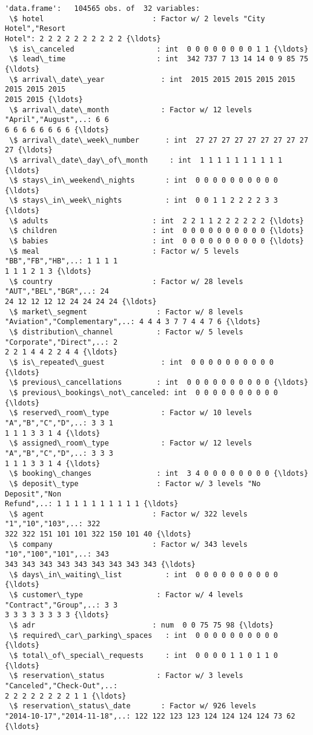 \documentclass[11pt]{article}
\begin{document}
    \begin{Verbatim}[commandchars=\\\{\}]
'data.frame':   104565 obs. of  32 variables:
 \$ hotel                         : Factor w/ 2 levels "City Hotel","Resort
Hotel": 2 2 2 2 2 2 2 2 2 2 {\ldots}
 \$ is\_canceled                   : int  0 0 0 0 0 0 0 0 1 1 {\ldots}
 \$ lead\_time                     : int  342 737 7 13 14 14 0 9 85 75 {\ldots}
 \$ arrival\_date\_year             : int  2015 2015 2015 2015 2015 2015 2015 2015
2015 2015 {\ldots}
 \$ arrival\_date\_month            : Factor w/ 12 levels "April","August",..: 6 6
6 6 6 6 6 6 6 6 {\ldots}
 \$ arrival\_date\_week\_number      : int  27 27 27 27 27 27 27 27 27 27 {\ldots}
 \$ arrival\_date\_day\_of\_month     : int  1 1 1 1 1 1 1 1 1 1 {\ldots}
 \$ stays\_in\_weekend\_nights       : int  0 0 0 0 0 0 0 0 0 0 {\ldots}
 \$ stays\_in\_week\_nights          : int  0 0 1 1 2 2 2 2 3 3 {\ldots}
 \$ adults                        : int  2 2 1 1 2 2 2 2 2 2 {\ldots}
 \$ children                      : int  0 0 0 0 0 0 0 0 0 0 {\ldots}
 \$ babies                        : int  0 0 0 0 0 0 0 0 0 0 {\ldots}
 \$ meal                          : Factor w/ 5 levels "BB","FB","HB",..: 1 1 1 1
1 1 1 2 1 3 {\ldots}
 \$ country                       : Factor w/ 28 levels "AUT","BEL","BGR",..: 24
24 12 12 12 12 24 24 24 24 {\ldots}
 \$ market\_segment                : Factor w/ 8 levels
"Aviation","Complementary",..: 4 4 4 3 7 7 4 4 7 6 {\ldots}
 \$ distribution\_channel          : Factor w/ 5 levels "Corporate","Direct",..: 2
2 2 1 4 4 2 2 4 4 {\ldots}
 \$ is\_repeated\_guest             : int  0 0 0 0 0 0 0 0 0 0 {\ldots}
 \$ previous\_cancellations        : int  0 0 0 0 0 0 0 0 0 0 {\ldots}
 \$ previous\_bookings\_not\_canceled: int  0 0 0 0 0 0 0 0 0 0 {\ldots}
 \$ reserved\_room\_type            : Factor w/ 10 levels "A","B","C","D",..: 3 3 1
1 1 1 3 3 1 4 {\ldots}
 \$ assigned\_room\_type            : Factor w/ 12 levels "A","B","C","D",..: 3 3 3
1 1 1 3 3 1 4 {\ldots}
 \$ booking\_changes               : int  3 4 0 0 0 0 0 0 0 0 {\ldots}
 \$ deposit\_type                  : Factor w/ 3 levels "No Deposit","Non
Refund",..: 1 1 1 1 1 1 1 1 1 1 {\ldots}
 \$ agent                         : Factor w/ 322 levels "1","10","103",..: 322
322 322 151 101 101 322 150 101 40 {\ldots}
 \$ company                       : Factor w/ 343 levels "10","100","101",..: 343
343 343 343 343 343 343 343 343 343 {\ldots}
 \$ days\_in\_waiting\_list          : int  0 0 0 0 0 0 0 0 0 0 {\ldots}
 \$ customer\_type                 : Factor w/ 4 levels "Contract","Group",..: 3 3
3 3 3 3 3 3 3 3 {\ldots}
 \$ adr                           : num  0 0 75 75 98 {\ldots}
 \$ required\_car\_parking\_spaces   : int  0 0 0 0 0 0 0 0 0 0 {\ldots}
 \$ total\_of\_special\_requests     : int  0 0 0 0 1 1 0 1 1 0 {\ldots}
 \$ reservation\_status            : Factor w/ 3 levels "Canceled","Check-Out",..:
2 2 2 2 2 2 2 2 1 1 {\ldots}
 \$ reservation\_status\_date       : Factor w/ 926 levels
"2014-10-17","2014-11-18",..: 122 122 123 123 124 124 124 124 73 62 {\ldots}
    \end{Verbatim}
\end{document}
